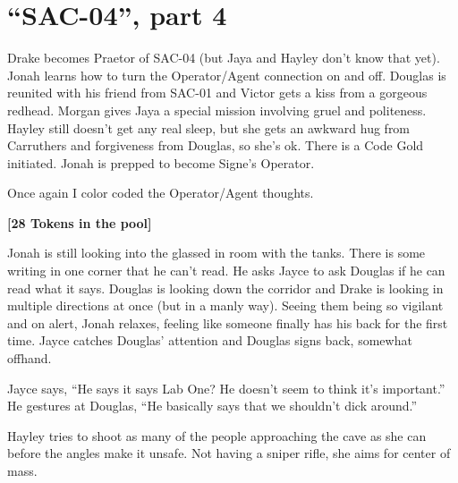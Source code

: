 \setcounter{chapter}{ 35 }
\chapter{\textbf{``SAC-04'', part 4} }






Drake becomes Praetor of SAC-04 (but Jaya and Hayley don't know that yet).  Jonah learns how to turn the Operator/Agent connection on and off.  Douglas is reunited with his friend from SAC-01 and Victor gets a kiss from a gorgeous redhead.  Morgan gives Jaya a special mission involving gruel and politeness.  Hayley still doesn't get any real sleep, but she gets an awkward hug from Carruthers and forgiveness from Douglas, so she's ok.  There is a Code Gold initiated. Jonah is prepped to become Signe's Operator.



Once again I color coded the Operator/Agent thoughts.









\textbf{{[}28 Tokens in the pool{]}}


Jonah is still looking into the glassed in room with the tanks.  There is some writing in one corner that he can't read.  He asks Jayce to ask Douglas if he can read what it says.  Douglas is looking down the corridor and Drake is looking in multiple directions at once (but in a manly way).  Seeing them being so vigilant and on alert, Jonah relaxes, feeling like someone finally has his back for the first time. Jayce catches Douglas' attention and Douglas signs back, somewhat offhand.



Jayce says, ``He says it says Lab One?  He doesn't seem to think it's important.''  He gestures at Douglas, ``He basically says that we shouldn't dick around.''





Hayley tries to shoot as many of the people approaching the cave as she can before the angles make it unsafe.  Not having a sniper rifle, she aims for center of mass.

